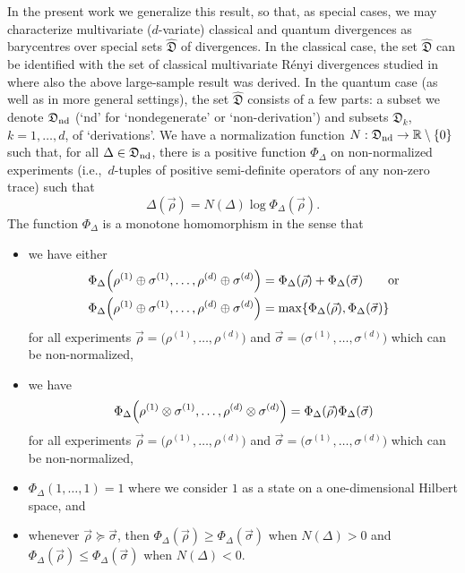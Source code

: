 \documentclass[12pt,a4paper,reqno]{amsart}
\theoremstyle{definition}
\newcommand{\mf}[1]{\mathfrak{#1}}
\newcommand{\R}{\mathbb R}
\let\originalleft\left
\let\originalright\right
\renewcommand{\left}{\mathopen{}\mathclose\bgroup\originalleft}
\renewcommand{\right}{\aftergroup\egroup\originalright}
\begin{document}
In the present work we generalize this result, so that, as special cases, we may characterize multivariate ($d$-variate) classical and quantum divergences as barycentres over special sets $\hat{\mf D}$ of divergences. In the classical case, the set $\hat{\mf D}$ can be identified with the set of classical multivariate R\'{e}nyi divergences studied in \cite{Farooq_et_al_2024,Verhagen_et_al_2024} where also the above large-sample result was derived. In the quantum case (as well as in more general settings), the set $\hat{\mf D}$ consists of a few parts: a subset we denote $\mf D_{\rm nd}$ (`nd' for `nondegenerate' or `non-derivation') and subsets $\mf D_k$, $k=1,\ldots,d$, of `derivations'. We have a normalization function $N:\mf D_{\rm nd}\to\R\setminus\{0\}$ such that, for all $\Delta\in\mf D_{\rm nd}$, there is a positive function $\Phi_\Delta$ on non-normalized experiments (i.e.,\ $d$-tuples of positive semi-definite operators of any non-zero trace) such that
\begin{equation}\label{eq:DeltaND}
\Delta(\vec{\rho})=N(\Delta)\log{\Phi_\Delta(\vec{\rho})}.
\end{equation}
The function $\Phi_\Delta$ is a monotone homomorphism in the sense that
\begin{itemize}
\item[(ND1)] we have either
\begin{align*}
\Phi_\Delta\left(\rho^{(1)}\oplus\sigma^{(1)},\ldots,\rho^{(d)}\oplus\sigma^{(d)}\right)&=\Phi_\Delta(\vec{\rho})+\Phi_\Delta(\vec{\sigma})\qquad {\rm or}\\
\Phi_\Delta\left(\rho^{(1)}\oplus\sigma^{(1)},\ldots,\rho^{(d)}\oplus\sigma^{(d)}\right)&=\max\left\{\Phi_\Delta(\vec{\rho}),\Phi_\Delta(\vec{\sigma})\right\}
\end{align*}
for all experiments $\vec{\rho}=\big(\rho^{(1)},\ldots,\rho^{(d)}\big)$ and $\vec{\sigma}=\big(\sigma^{(1)},\ldots,\sigma^{(d)}\big)$ which can be non-normalized,
\item[(ND2)] we have
$$
\Phi_\Delta\left(\rho^{(1)}\otimes\sigma^{(1)},\ldots,\rho^{(d)}\otimes\sigma^{(d)}\right)=\Phi_\Delta(\vec{\rho})\Phi_\Delta(\vec{\sigma})
$$
for all experiments $\vec{\rho}=\big(\rho^{(1)},\ldots,\rho^{(d)}\big)$ and $\vec{\sigma}=\big(\sigma^{(1)},\ldots,\sigma^{(d)}\big)$ which can be non-normalized,
\item[(ND3)] $\Phi_\Delta(1,\ldots,1)=1$ where we consider $1$ as a state on a one-dimensional Hilbert space, and
\item[(ND4)] whenever $\vec{\rho}\succeq\vec{\sigma}$, then $\Phi_\Delta(\vec{\rho})\geq\Phi_\Delta(\vec{\sigma})$ when $N(\Delta)>0$ and $\Phi_\Delta(\vec{\rho})\leq\Phi_\Delta(\vec{\sigma})$ when $N(\Delta)<0$.
\end{itemize}
\end{document}
